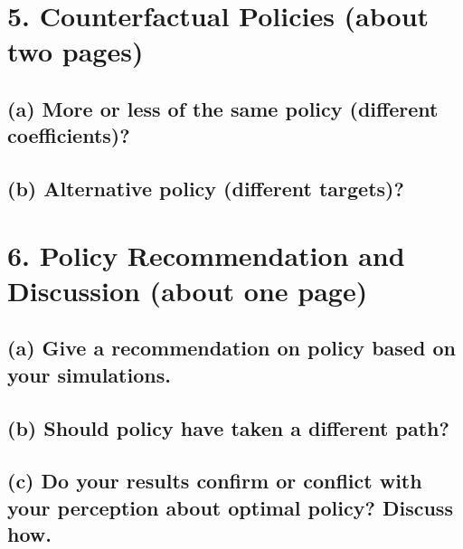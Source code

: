 \documentclass[12pt]{article}
\begin{document}
\newpage
\section*{5. Counterfactual Policies (about two pages)}
\subsection*{(a) More or less of the same policy (different coefficients)?}

\subsection*{(b) Alternative policy (different targets)?}







\section*{6. Policy Recommendation and Discussion (about one page)}
\subsection*{(a) Give a recommendation on policy based on your simulations.}

\subsection*{(b) Should policy have taken a different path?}

\subsection*{(c) Do your results confirm or conflict with your perception about optimal policy? Discuss how.}

\appendix
\end{document}
